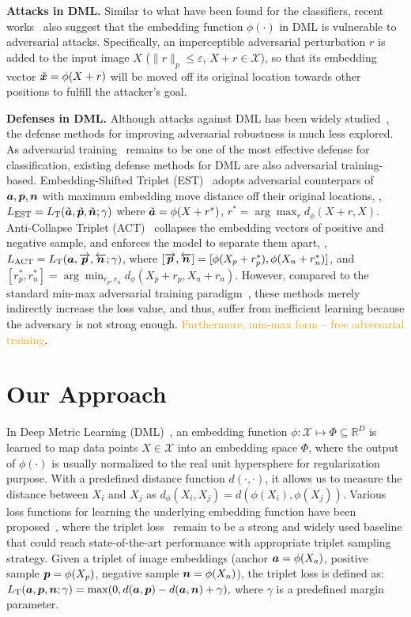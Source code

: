 \documentclass[10pt,twocolumn,letterpaper]{article}
\newcommand{\oo}[1]{\textcolor{orange}{#1}}
\begin{document}
\textbf{Attacks in DML.}
%
Similar to what have been found for the classifiers, recent
works~\cite{robrank,advrank,advorder} also suggest that the embedding function
$\phi(\cdot)$ in DML is vulnerable to adversarial attacks.
%
Specifically, an imperceptible adversarial perturbation $r$ is added to the
input image $X$ ($\|r\|_p \leq \varepsilon$, $X+r\in \mathcal{X}$), so that its
embedding vector $\tilde{{\bm{x}}}=\phi(X+r)$ will be moved off its original
location towards other positions to fulfill the attacker's goal.

\textbf{Defenses in DML.}
%
Although attacks against DML has been widely studied~\cite{advrank,advorder},
the defense methods for improving adversarial robustness is much less explored.
%
As adversarial training~\cite{madry} remains to be one of the most effective
defense for classification, existing defense methods for DML are also
adversarial training-based.
%
Embedding-Shifted Triplet (EST)~\cite{advrank} adopts adversarial counterpars
of ${\bm{a}},{\bm{p}},{\bm{n}}$ with maximum embedding move distance off their original
locations, \ie,
$L_\text{EST}=L_\text{T}(\tilde{{\bm{a}}},\tilde{{\bm{p}}},\tilde{{\bm{n}}};\gamma)$ where
$\tilde{{\bm{a}}}=\phi(X+r^*)$, $r^*=\arg\max_{r}d_\phi(X+r, X)$.
%
Anti-Collapse Triplet (ACT)~\cite{robrank} collapses the embedding vectors of
positive and negative sample, and enforces the model to separate them apart,
\ie, $L_\text{ACT}=L_\text{T}({\bm{a}}, \overrightarrow{{\bm{p}}},
\overleftarrow{{\bm{n}}};\gamma)$, where $[\overrightarrow{{\bm{p}}},\overleftarrow{{\bm{n}}}]
=[\phi(X_p+r_p^*), \phi(X_n+r_n^*)]$, and $[r_p^*,r_n^*]=\arg\min_{r_p,r_n}
d_\phi(X_p+r_p, X_n+r_n)$.
%
However, compared to the standard min-max adversarial training
paradigm~\cite{madry}, these methods merely indirectly increase the loss value,
and thus, suffer from inefficient learning because the adversary is not strong
enough.
%
\oo{Furthermore, min-max form -- free adversarial training}.


\section{Our Approach}
\label{sec:3}

In Deep Metric Learning (DML)~\cite{revisiting,dmlreality}, an embedding
function $\phi:\mathcal{X}\mapsto \Phi \subseteq \mathbb{R}^D$ is learned to
map data points $X\in\mathcal{X}$ into an embedding space $\Phi$, where the
output of $\phi(\cdot)$ is usually normalized to the real unit hypersphere for
regularization purpose.
%
With a predefined distance function $d(\cdot,\cdot)$, it allows us to measure
the distance between $X_i$ and $X_j$ as
$d_\phi(X_i,X_j)=d(\phi(X_i),\phi(X_j))$.
%
Various loss functions for learning the underlying embedding function have been
proposed~\cite{revisiting,dmlreality}, where the triplet loss~\cite{facenet}
remain to be a strong and widely used baseline that could reach
state-of-the-art performance with appropriate triplet sampling strategy.
%
Given a triplet of image embeddings (anchor ${\bm{a}}=\phi(X_a)$, positive sample
${\bm{p}}=\phi(X_p)$, negative sample ${\bm{n}}=\phi(X_n)$), the triplet loss is defined
as:
%
$
%
	L_\text{T}(\va, \vp, \vn; \gamma) = \max(0, d(\va, \vp) - d(\va, \vn) +
	\gamma),
%
$
%
where $\gamma$ is a predefined margin parameter.
\end{document}
